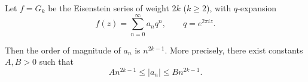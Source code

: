 Let $f = G_k$ be the Eisenstein series of weight $2k$ ($k \geq 2$), with $q$-expansion
$$f(z) = \sum_{n=0}^{\infty} a_n q^n, \qquad q = e^{2\pi i z}.$$

Then the order of magnitude of $a_n$ is $n^{2k-1}$. More precisely, there exist constants $A, B > 0$ such that
$$A n^{2k-1} \leq |a_n| \leq B n^{2k-1}.$$
